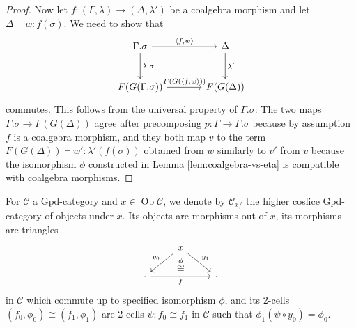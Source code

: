 \documentclass[a4paper]{article}
\theoremstyle{remark}
\theoremstyle{definition}
\begin{document}
\begin{proof}
  Now let $f : (\Gamma, \lambda) \rightarrow (\Delta, \lambda')$ be a coalgebra morphism and let $\Delta \vdash w : f(\sigma)$.
  We need to show that
  \begin{equation}
    \begin{tikzcd}[column sep=large, row sep=large]
      \Gamma.\sigma \arrow[r, "{\langle f, w \rangle}"] \arrow[d, "\lambda.\sigma"] & \Delta \arrow[d, "\lambda'"] \\
      F(G(\Gamma.\sigma)) \arrow[r, "{F(G(\langle f, w \rangle}))"] & F(G(\Delta))
    \end{tikzcd}
  \end{equation}
  commutes.
  This follows from the universal property of $\Gamma.\sigma$:
  The two maps $\Gamma.\sigma \rightarrow F(G(\Delta))$ agree after precomposing $p : \Gamma \rightarrow \Gamma.\sigma$ because by assumption $f$ is a coalgebra morphism, and they both map $v$ to the term $F(G(\Delta)) \vdash w' : \lambda'(f(\sigma))$ obtained from $w$ similarly to $v'$ from $v$ because the isomorphism $\phi$ constructed in Lemma \ref{lem:coalgebra-vs-eta} is compatible with coalgebra morphisms.
\end{proof}

For $\mathcal{C}$ a $\mathrm{Gpd}$-category and $x \in \operatorname{Ob} \mathcal{C}$, we denote by $\mathcal{C}_{x / }$ the higher coslice $\mathrm{Gpd}$-category of objects under $x$.
Its objects are morphisms out of $x$, its morphisms are triangles
\begin{equation}
  \begin{tikzcd}
    & x \arrow[dl, "y_0"'] \arrow[dr, "y_1"] \arrow[d, "\overset{\phi}{\cong}", phantom] & \\
    \cdot \arrow[rr, "f"'] & \, & \cdot
  \end{tikzcd}
\end{equation}
in $\mathcal{C}$ which commute up to specified isomorphism $\phi$, and its 2-cells $(f_0, \phi_0) \cong (f_1, \phi_1)$ are 2-cells $\psi : f_0 \cong f_1$ in $\mathcal{C}$ such that $\phi_1 (\psi \circ y_0) = \phi_0$.
\end{document}
